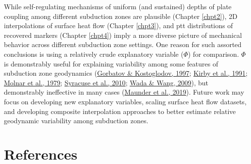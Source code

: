 While self-regulating mechanisms of uniform (and sustained) depths of plate coupling among different subduction zones are plausible (Chapter \ref{chpt2}), 2D interpolations of surface heat flow (Chapter \ref{chpt3}), and \gls{ptt} distributions of recovered markers (Chapter \ref{chpt4}) imply a more diverse picture of mechanical behavior across different subduction zone settings. One reason for such assorted conclusions is using a relatively crude explanatory variable (\(\Phi\)) for comparison. \(\Phi\) is demonstrably useful for explaining variability among some features of subduction zone geodynamics (\protect\hyperlink{ref-gorbatov1997}{Gorbatov \& Kostoglodov, 1997}; \protect\hyperlink{ref-kirby1991}{Kirby et al., 1991}; \protect\hyperlink{ref-molnar1979}{Molnar et al., 1979}; \protect\hyperlink{ref-syracuse2010}{Syracuse et al., 2010}; \protect\hyperlink{ref-wada2009}{Wada \& Wang, 2009}), but demonstrably ineffective in many cases (\protect\hyperlink{ref-maunder2019}{Maunder et al., 2019}). Future work may focus on developing new explanatory variables, scaling surface heat flow datasets, and developing composite interpolation approaches to better estimate relative geodynamic variability among subduction zones.

\cleardoublepage

\hypertarget{references}{%
\chapter*{References}\label{references}}


